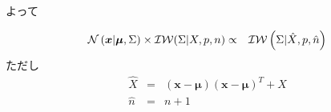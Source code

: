 \documentclass[a4j]{jarticle}
\begin{document}
よって
\begin{screen}
\begin{eqnarray}
\operatorname{\mathcal{N}}{(\boldsymbol{x} | \boldsymbol{\mu}, \Sigma)} \times \operatorname{\mathcal{IW}}(\Sigma | X, p, n)
&\propto& 
\operatorname{\mathcal{IW}}{\left( \Sigma | \hat{X}, p, \hat{n} \right)}
\end{eqnarray}
ただし
\begin{eqnarray}
\hat{X} &=& \left( \boldsymbol{x} - \boldsymbol{\mu}\right) \left(\boldsymbol{x} - \boldsymbol{\mu}\right)^T + X\\
\hat{n} &=& n + 1
\end{eqnarray}
\end{screen}
\end{document}
